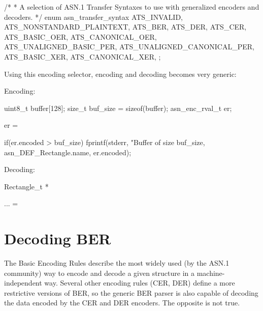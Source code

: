 \documentclass[english,oneside,12pt]{book}
\begin{document}
\begin{codesample}[basicstyle=\scriptsize\listingfont]
/*
 * A selection of ASN.1 Transfer Syntaxes to use with generalized encoders and decoders.
 */
enum asn_transfer_syntax {
    ATS_INVALID,
    ATS_NONSTANDARD_PLAINTEXT,
    ATS_BER,
    ATS_DER,
    ATS_CER,
    ATS_BASIC_OER,
    ATS_CANONICAL_OER,
    ATS_UNALIGNED_BASIC_PER,
    ATS_UNALIGNED_CANONICAL_PER,
    ATS_BASIC_XER,
    ATS_CANONICAL_XER,
};
\end{codesample}

Using this encoding selector, encoding and decoding becomes very generic:

\noindent{}Encoding:

\begin{codesample}[basicstyle=\scriptsize\listingfont]
uint8_t buffer[128];
size_t buf_size = sizeof(buffer);
asn_enc_rval_t er;

er = %

if(er.encoded > buf_size) {
    fprintf(stderr, "Buffer of size %
        buf_size, asn_DEF_Rectangle.name, er.encoded);
}
\end{codesample}

\noindent{}Decoding:

\begin{codesample}[basicstyle=\scriptsize\listingfont]
Rectangle_t *%

... = %
\end{codesample}

\section{\label{sec:Decoding-BER}Decoding BER}

The Basic Encoding Rules describe the most widely used (by the ASN.1
community) way to encode and decode a given structure in a machine-independent
way. Several other encoding rules (CER, DER) define a more restrictive
versions of BER, so the generic BER parser is also capable of decoding
the data encoded by the CER and DER encoders. The opposite is not true.
\end{document}
